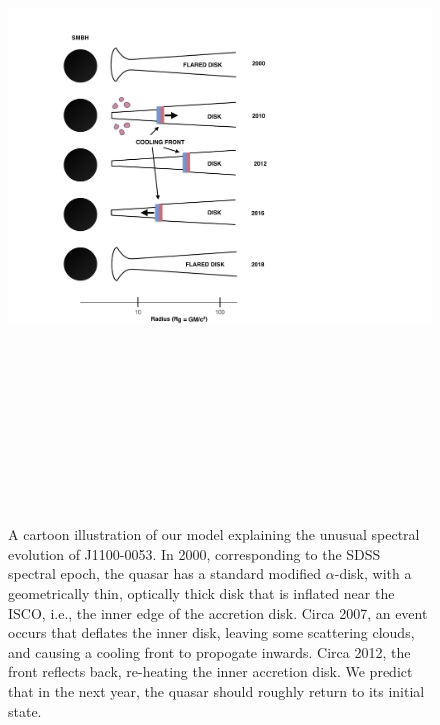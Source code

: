\documentclass{nature}
\begin{document}
\begin{figure}
  \includegraphics[width=15.4cm, height=18.75cm, trim=0.0cm 0.0cm 0.0cm 0.0cm, clip]
  {../plots/models/cartoon_v2.pdf}
  \centering
  \caption[]{
    A cartoon illustration of our model explaining the unusual spectral
    evolution of J1100-0053. In 2000, corresponding to the SDSS
    spectral epoch, the quasar has a standard modified $\alpha$-disk, with
    a geometrically thin, optically thick disk that is inflated near
    the ISCO, i.e., the inner edge of the accretion disk.  Circa 2007,
    an event occurs that deflates the inner disk, leaving some scattering
    clouds, and causing a cooling front to propogate inwards.  Circa
    2012, the front reflects back, re-heating the inner accretion disk.
    We predict that in the next year, the quasar should roughly return
    to its initial state.}
  \label{fig:J110057_diskmodel}
\end{figure}
\end{document}
